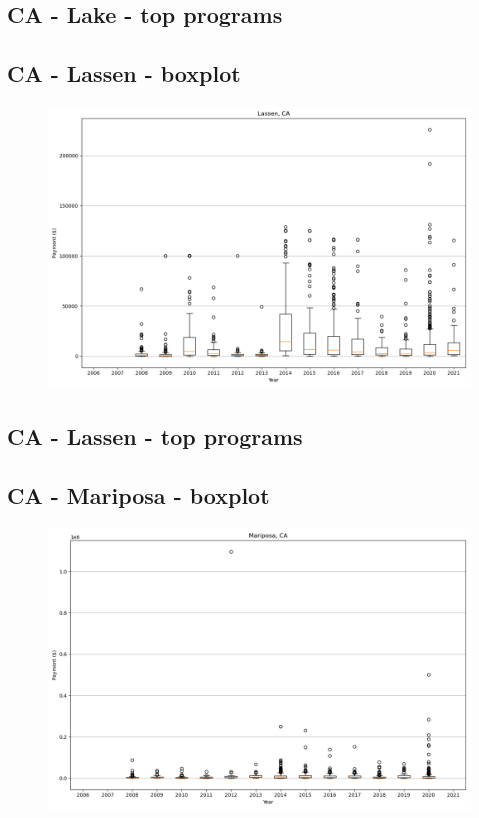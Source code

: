 \subsection*{CA - Lake - top programs}

\newpage
\subsection*{CA - Lassen - boxplot}
\begin{figure}[h]
\centering
\includegraphics[width=7in]{../output/boxplots/counties/Lassen-CA_boxplot.png}
\end{figure}


\subsection*{CA - Lassen - top programs}

\newpage
\subsection*{CA - Mariposa - boxplot}
\begin{figure}[h]
\centering
\includegraphics[width=7in]{../output/boxplots/counties/Mariposa-CA_boxplot.png}
\end{figure}


